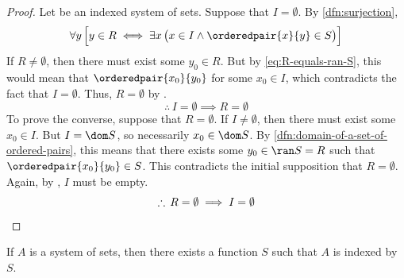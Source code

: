 \begin{proof}
    Let  be an indexed system of sets. Suppose that \( I = \emptyset \). By
    \cref{dfn:surjection},
    \begin{equation}
        \label{eq:R-equals-ran-S}
        \forall y \, \Big[ y \in R \iff \exists x \, \big( x \in I \land \orderedpair{x}{y} \in S \big) \Big]
    \end{equation}
    If \( R \neq \emptyset \), then there must exist some \( y_{0} \in R \). But by \eqref{eq:R-equals-ran-S},
    this would mean that \( \orderedpair{x_{0}}{y_{0}} \) for some \( x_{0} \in I \), which contradicts the fact that
    \( I = \emptyset \). Thus, \( R = \emptyset \) by .
    \begin{equation*}
        \therefore \, I = \emptyset \implies R = \emptyset
    \end{equation*}
    To prove the converse, suppose that \( R = \emptyset \). If \( I \neq \emptyset \), then
    there must exist some \( x_{0} \in I \). But \( I = \dom S \), so necessarily \( x_{0} \in \dom S \).
    By \cref{dfn:domain-of-a-set-of-ordered-pairs}, this means that there exists some \( y_{0} \in \ran S = R \)
    such that \( \orderedpair{x_{0}}{y_{0}} \in S \). This contradicts the initial supposition that \( R = \emptyset \).
    Again, by , \( I \) must be empty.
    \begin{equation*}
        \therefore \, R = \emptyset \implies I = \emptyset \qedhere
    \end{equation*}
\end{proof}

\begin{thm}
    \label{thm:any-system-of-sets-can-be-indexed}
    If \( A \) is a system of sets, then there exists a function \( S \) such that
    \( A \) is indexed by \( S \).
\end{thm}

